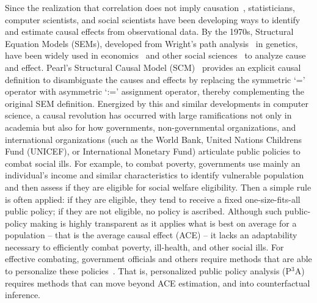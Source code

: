 \documentclass[letterpaper]{article} %
\begin{document}
Since the realization that correlation does not imply causation~\cite{wright1921correlationcausation, fisher1936designofexperiments}, statisticians, computer scientists, and social scientists have been developing ways to identify and estimate causal effects from observational data.
By the 1970s, Structural Equation Models (SEMs), developed from Wright's path analysis~\cite{wright1921correlationcausation} in genetics, have been widely used in economics~\cite{Haavelmo1943SEM, Goldberger1972SEMecon} and other social sciences~\cite{Duncan1974SEMsocio, Ploch1975SEM, Fienberg1975Introduction2SEM} to analyze cause and effect. 
Pearl's Structural Causal Model (SCM)~\cite{pearl2009causality} provides an explicit causal definition to disambiguate the causes and effects by replacing the symmetric `=' operator with asymmetric `:=' assignment operator, thereby complementing the original SEM definition.
Energized by this and similar developments in computer science, a causal revolution has occurred with large ramifications not only in academia but also for how governments, non-governmental organizations, and international organizations (such as the World Bank, United Nations Childrens Fund (UNICEF), or International Monetary Fund) articulate public policies to combat social ills. For example, to combat poverty, governments use mainly an individual's income and similar characteristics to identify vulnerable population and then assess if they are eligible for social welfare eligibility. Then a simple rule is often applied: if they are eligible, they tend to receive a fixed one-size-fits-all public policy; if they are not eligible, no policy is ascribed. Although such public-policy making is highly transparent as it applies what is best on average for a population -- that is the average causal effect (ACE) -- it lacks an adaptability necessary to efficiently combat poverty, ill-health, and other social ills. For effective combating, government officials and others require methods that are able to personalize these policies~\cite{kino2021adelmlreview}. That is, personalized public policy analysis (P$^3$A) requires methods that can move beyond ACE estimation, and into counterfactual inference.
\end{document}
